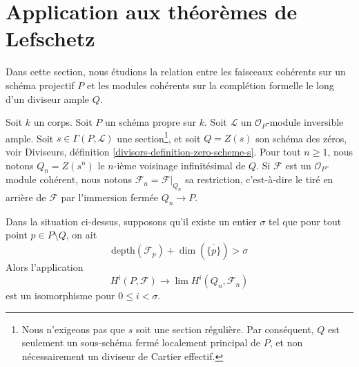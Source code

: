 \section{Application aux théorèmes de Lefschetz}
\label{section-lefschetz}

\noindent
Dans cette section, nous étudions la relation entre les faisceaux cohérents sur un
schéma projectif $P$ et les modules cohérents sur la complétion formelle le long
d'un diviseur ample $Q$.

\medskip\noindent
Soit $k$ un corps. Soit $P$ un schéma propre sur $k$.
Soit $\mathcal{L}$ un $\mathcal{O}_P$-module inversible ample.
Soit $s \in \Gamma(P, \mathcal{L})$ une section\footnote{Nous n'exigeons pas
que $s$ soit une section régulière. Par conséquent, $Q$ est seulement
un sous-schéma fermé localement principal de $P$, et non nécessairement un diviseur
de Cartier effectif.}, et soit
$Q = Z(s)$ son schéma des zéros, voir
Diviseurs, définition \ref{divisors-definition-zero-scheme-s}.
Pour tout $n \geq 1$, nous notons $Q_n = Z(s^n)$
le $n$-ième voisinage infinitésimal de $Q$.
Si $\mathcal{F}$ est un $\mathcal{O}_P$-module cohérent, nous notons
$\mathcal{F}_n = \mathcal{F}|_{Q_n}$ sa restriction, c'est-à-dire
le tiré en arrière de $\mathcal{F}$ par l'immersion fermée
$Q_n \to P$.

\begin{proposition}
\label{proposition-lefschetz}
Dans la situation ci-dessus, supposons qu'il existe un entier $\sigma$ tel que
pour tout point $p \in P \setminus Q$, on ait
$$
\text{depth}(\mathcal{F}_p) + \dim(\overline{\{p\}}) > \sigma
$$
Alors l'application
$$
H^i(P, \mathcal{F}) \longrightarrow \lim H^i(Q_n, \mathcal{F}_n)
$$
est un isomorphisme pour $0 \leq i < \sigma$.
\end{proposition}

